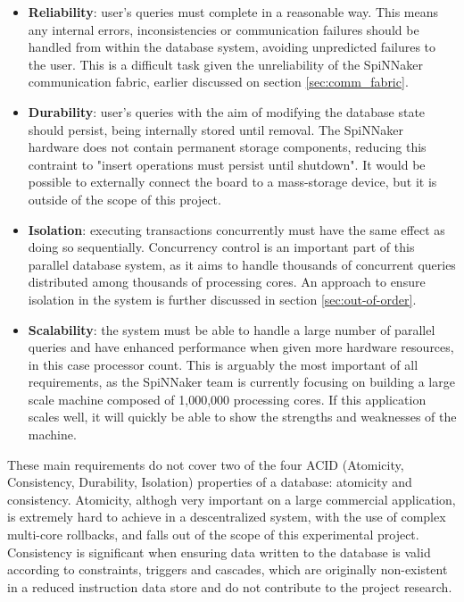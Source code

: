 \begin{itemize}
	\item \textbf{Reliability}: user's queries must complete in a reasonable way. This means any internal errors, inconsistencies or communication failures should be handled from within the database system, avoiding unpredicted failures to the user. This is a difficult task given the unreliability of the SpiNNaker communication fabric, earlier discussed on section \ref{sec:comm_fabric}.
	\item \textbf{Durability}: user's queries with the aim of modifying the database state should persist, being internally stored until removal. The SpiNNaker hardware does not contain permanent storage components, reducing this contraint to "insert operations must persist until shutdown". It would be possible to externally connect the board to a mass-storage device, but it is outside of the scope of this project.
	\item \textbf{Isolation}: executing transactions concurrently must have the same effect as doing so sequentially. Concurrency control is an important part of this parallel database system, as it aims to handle thousands of concurrent queries distributed among thousands of processing cores. An approach to ensure isolation in the system is further discussed in section \ref{sec:out-of-order}.
	\item \textbf{Scalability}: the system must be able to handle a large number of parallel queries and have enhanced performance when given more hardware resources, in this case processor count.	This is arguably the most important of all requirements, as the SpiNNaker team is currently focusing on building a large scale machine composed of 1,000,000 processing cores. If this application scales well, it will quickly be able to show the strengths and weaknesses of the machine.
\end{itemize}

These main requirements do not cover two of the four ACID (Atomicity, Consistency, Durability, Isolation) properties of a database: atomicity and consistency. Atomicity, althogh very important on a large commercial application, is extremely hard to achieve in a descentralized system, with the use of complex multi-core rollbacks, and falls out of the scope of this experimental project. Consistency is significant when ensuring data written to the database is valid according to constraints, triggers and cascades, which are originally non-existent in a reduced instruction data store and do not contribute to the project research.

